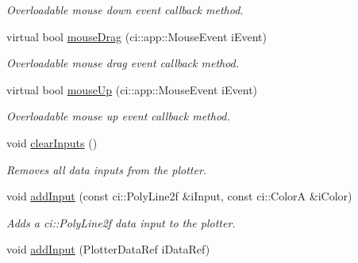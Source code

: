 \begin{DoxyCompactItemize}
\begin{DoxyCompactList}\small\item\em Overloadable mouse down event callback method. \end{DoxyCompactList}\item 
\hypertarget{class_ui_plot_a85b1ca17a9d20c30c2d1a1df7ff3b6e5}{virtual bool \hyperlink{class_ui_plot_a85b1ca17a9d20c30c2d1a1df7ff3b6e5}{mouse\-Drag} (ci\-::app\-::\-Mouse\-Event i\-Event)}\label{class_ui_plot_a85b1ca17a9d20c30c2d1a1df7ff3b6e5}

\begin{DoxyCompactList}\small\item\em Overloadable mouse drag event callback method. \end{DoxyCompactList}\item 
\hypertarget{class_ui_plot_a0a11274f2d4f9a2a23630da46711a4f7}{virtual bool \hyperlink{class_ui_plot_a0a11274f2d4f9a2a23630da46711a4f7}{mouse\-Up} (ci\-::app\-::\-Mouse\-Event i\-Event)}\label{class_ui_plot_a0a11274f2d4f9a2a23630da46711a4f7}

\begin{DoxyCompactList}\small\item\em Overloadable mouse up event callback method. \end{DoxyCompactList}\item 
\hypertarget{class_ui_plot_abb351c1945f85f48a611b3b13cf84e47}{void \hyperlink{class_ui_plot_abb351c1945f85f48a611b3b13cf84e47}{clear\-Inputs} ()}\label{class_ui_plot_abb351c1945f85f48a611b3b13cf84e47}

\begin{DoxyCompactList}\small\item\em Removes all data inputs from the plotter. \end{DoxyCompactList}\item 
\hypertarget{class_ui_plot_a802ba6f658a49d4bb1ad6774d6ab82ad}{void \hyperlink{class_ui_plot_a802ba6f658a49d4bb1ad6774d6ab82ad}{add\-Input} (const ci\-::\-Poly\-Line2f \&i\-Input, const ci\-::\-Color\-A \&i\-Color)}\label{class_ui_plot_a802ba6f658a49d4bb1ad6774d6ab82ad}

\begin{DoxyCompactList}\small\item\em Adds a ci\-::\-Poly\-Line2f data input to the plotter. \end{DoxyCompactList}\item 
\hypertarget{class_ui_plot_abf9dcc2ad03c50690ee2b729e529ace5}{void \hyperlink{class_ui_plot_abf9dcc2ad03c50690ee2b729e529ace5}{add\-Input} (Plotter\-Data\-Ref i\-Data\-Ref)}\label{class_ui_plot_abf9dcc2ad03c50690ee2b729e529ace5}


\end{DoxyCompactItemize}
